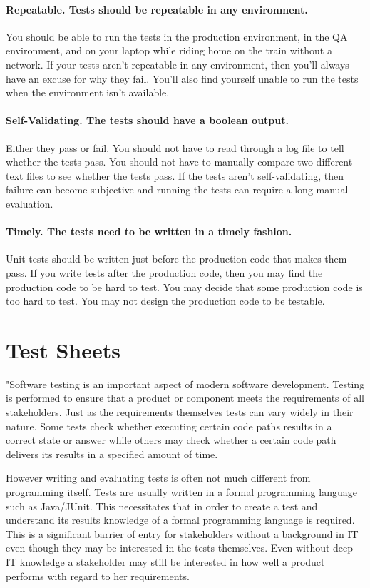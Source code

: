 \documentclass{llncs}
\begin{document}
\paragraph{Repeatable. Tests should be repeatable in any environment.}
You should be able to run the tests in the production environment, in the QA environment, and on your laptop while riding home on the train without a network. 
If your tests aren’t repeatable in any environment, then you’ll always have an excuse for why they fail. 
You’ll also ﬁnd yourself unable to run the tests when the environment isn’t available.\cite{MartinClean}

\paragraph{Self-Validating. The tests should have a boolean output.}
Either they pass or fail. 
You should not have to read through a log ﬁle to tell whether the tests pass. 
You should not have to manually compare two different text ﬁles to see whether the tests pass. 
If the tests aren’t self-validating, then failure can become subjective and running the tests can require a long manual evaluation.\cite{MartinClean}

\paragraph{Timely. The tests need to be written in a timely fashion.}
Unit tests should be written just before the production code that makes them pass. 
If you write tests after the production code, then you may ﬁnd the production code to be hard to test. 
You may decide that some production code is too hard to test. 
You may not design the production code to be testable.\cite{MartinClean}

\section{Test Sheets}
"Software testing is an important aspect of modern software development.
Testing is performed to ensure that a product or component meets the requirements of all stakeholders.
Just as the requirements themselves tests can vary widely in their nature.
Some tests check whether executing certain code paths results in a correct state or answer while others may check whether a certain code path delivers its results in a specified amount of time.

However writing and evaluating tests is often not much different from programming itself.
Tests are usually written in a formal programming language such as Java/JUnit.
This necessitates that in order to create a test and understand its results knowledge of a formal programming language is required.
This is a significant barrier of entry for stakeholders without a background in IT even though they may be interested in the tests themselves.
Even without deep IT knowledge a stakeholder may still be interested in how well a product performs with regard to her requirements.
\end{document}
